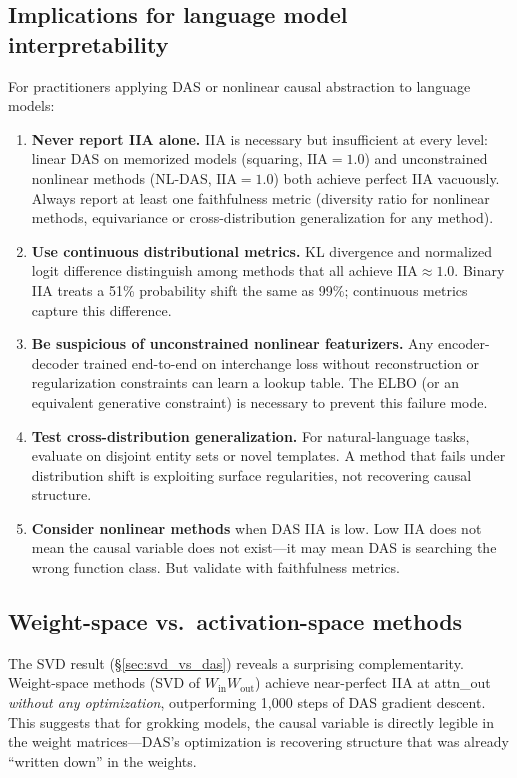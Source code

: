 \documentclass{article}
\newcommand{\IIA}{\mathrm{IIA}}
\begin{document}
\subsection{Implications for language model interpretability}

For practitioners applying DAS or nonlinear causal abstraction to language
models:
\begin{enumerate}
\item \textbf{Never report IIA alone.} IIA is necessary but insufficient at
  every level: linear DAS on memorized models (squaring, $\IIA = 1.0$) and
  unconstrained nonlinear methods (NL-DAS, $\IIA = 1.0$) both achieve
  perfect IIA vacuously. Always report at least one faithfulness metric
  (diversity ratio for nonlinear methods, equivariance or cross-distribution
  generalization for any method).
\item \textbf{Use continuous distributional metrics.} KL divergence and
  normalized logit difference distinguish among methods that all achieve
  $\IIA \approx 1.0$. Binary IIA treats a 51\% probability shift the same as
  99\%; continuous metrics capture this difference.
\item \textbf{Be suspicious of unconstrained nonlinear featurizers.} Any
  encoder-decoder trained end-to-end on interchange loss without reconstruction
  or regularization constraints can learn a lookup table. The ELBO
  (or an equivalent generative constraint) is necessary to prevent this
  failure mode.
\item \textbf{Test cross-distribution generalization.} For natural-language
  tasks, evaluate on disjoint entity sets or novel templates. A method that
  fails under distribution shift is exploiting surface regularities, not
  recovering causal structure.
\item \textbf{Consider nonlinear methods} when DAS IIA is low. Low IIA does not
  mean the causal variable does not exist---it may mean DAS is searching the
  wrong function class. But validate with faithfulness metrics.
\end{enumerate}

\subsection{Weight-space vs.\ activation-space methods}

The SVD result (\S\ref{sec:svd_vs_das}) reveals a surprising complementarity.
Weight-space methods (SVD of $W_\text{in} W_\text{out}$) achieve near-perfect
IIA at attn\_out \emph{without any optimization}, outperforming 1{,}000 steps
of DAS gradient descent. This suggests that for grokking models, the causal
variable is directly legible in the weight matrices---DAS's optimization
is recovering structure that was already ``written down'' in the weights.
\end{document}
